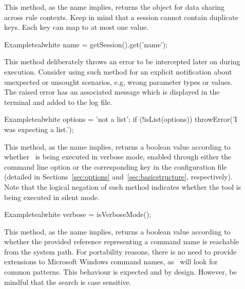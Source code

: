 \begin{description}
\item[] This method, as the name implies, returns the  object for data sharing across rule contexts. Keep in mind that a session cannot contain duplicate keys. Each key can map to at most one value.

\begin{codebox}{Example}{teal}{\icnote}{white}
name = getSession().get('name');
\end{codebox}

\item[] This method deliberately throws an error to be intercepted later on during execution. Consider using such method for an explicit notification about unexpected or unsought scenarios, e.g, wrong parameter types or values. The raised error has an associated message which is displayed in the terminal and added to the log file.

\begin{codebox}{Example}{teal}{\icnote}{white}
options = 'not a list';
if (!isList(options)) {
    throwError('I was expecting a list.');
}
\end{codebox}

\item[] This method, as the name implies, returns a boolean value according to whether \arara\ is being executed in verbose mode, enabled through either the  command line option or the corresponding key in the configuration file (detailed in Sections~\ref{sec:options} and~\ref{sec:basicstructure}, respectively). Note that the logical negation of such method indicates whether the tool is being executed in silent mode.

\begin{codebox}{Example}{teal}{\icnote}{white}
verbose = isVerboseMode();
\end{codebox}

\item[] This method, as the name implies, returns a boolean value according to whether the provided  reference representing a command name is reachable from the system path.  For portability reasons, there is no need to provide extensions to Microsoft Windows command names, as \arara\ will look for common patterns. This behaviour is expected and by design. However, be mindful that the search is case sensitive.


\end{description}
